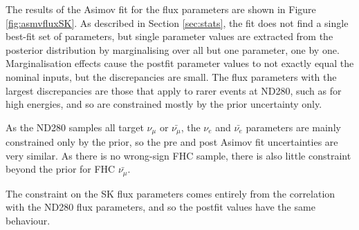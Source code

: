 The results of the Asimov fit for the flux parameters are shown in Figure \ref{fig:asmvfluxSK}. As described in Section \ref{sec:stats}, the fit does not find a single best-fit set of parameters, but single parameter values are extracted from the posterior distribution by marginalising over all but one parameter, one by one. Marginalisation effects cause the postfit parameter values to not exactly equal the nominal inputs, but the discrepancies are small. The flux parameters with the largest discrepancies are those that apply to rarer events at ND280, such as for high energies, and so are constrained mostly by the prior uncertainty only.

As the ND280 samples all target $\nu_{\mu}$ or $\bar{\nu_{\mu}}$, the $\nu_e$ and $\bar{\nu_e}$ parameters are mainly constrained only by the prior, so the pre and post Asimov fit uncertainties are very similar. As there is no wrong-sign FHC sample, there is also little constraint beyond the prior for FHC $\bar{\nu_{\mu}}$. 

The constraint on the SK flux parameters comes entirely from the correlation with the ND280 flux parameters, and so the postfit values have the same behaviour.

